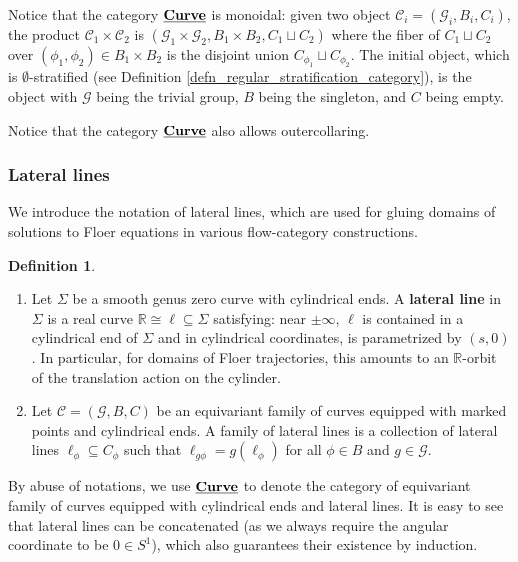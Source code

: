 \documentclass[reqno, 10pt]{amsart}
\numberwithin{equation}{section}
\numberwithin{equation}{section}
\renewcommand{\subset}{\subseteq}
\theoremstyle{definition}
\newtheorem{defn}[thm]{Definition}
\theoremstyle{remark}
\newcommand{\mb}{\mathbb}
\newcommand{\mc}{\mathcal}
\newcommand{\uds}[1]{\underline{\smash{#1}}}
\begin{document}
Notice that the category $\uds{\bf Curve}$ is monoidal: given two object ${\mc C}_i = ({\mc G}_i, B_i, C_i)$, the product ${\mc C}_1 \times {\mc C}_2$ is $({\mc G}_1 \times {\mc G}_2, B_1 \times B_2, C_1 \sqcup C_2)$ where the fiber of $C_1 \sqcup C_2$ over $(\phi_1, \phi_2) \in B_1\times B_2$ is the disjoint union $C_{\phi_1}\sqcup C_{\phi_2}$. The initial object, which is $\emptyset$-stratified (see Definition \ref{defn_regular_stratification_category}), is the object with ${\mc G}$ being the trivial group, $B$ being the singleton, and $C$ being empty. 

Notice that the category $\uds{\bf Curve}$ also allows outercollaring.


\subsubsection{Lateral lines}

We introduce the notation of lateral lines, which are used for gluing domains of solutions to Floer equations in various flow-category constructions.

\begin{defn}\label{defn:lateral-line}
\begin{enumerate}

\item Let $\Sigma$ be a smooth genus zero curve with cylindrical ends. A {\bf lateral line} in $\Sigma$ is a real curve ${\mb R} \cong \ell \subset \Sigma$ satisfying: near $\pm \infty$, $\ell$ is contained in a cylindrical end of $\Sigma$ and in cylindrical coordinates, is parametrized by $(s, 0)$. In particular, for domains of Floer trajectories, this amounts to an ${\mb R}$-orbit of the translation action on the cylinder.

\item Let ${\mc C} = ({\mc G}, B, C)$ be an equivariant family of curves equipped with marked points and cylindrical ends. A family of lateral lines is a collection of lateral lines $\ell_\phi \subset C_\phi$ such that $\ell_{g\phi} = g(\ell_\phi)$ for all $\phi \in B$ and $g \in {\mc G}$.
\end{enumerate}
\end{defn}

By abuse of notations, we use $\uds{\bf Curve}$ to denote the category of equivariant family of curves equipped with cylindrical ends and lateral lines. It is easy to see that lateral lines can be concatenated (as we always require the angular coordinate to be $0 \in S^1$), which also guarantees their existence by induction.
\end{document}
